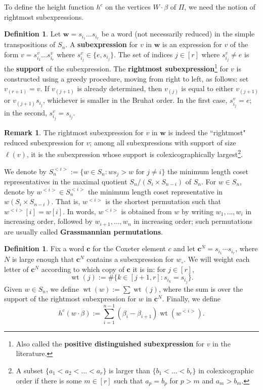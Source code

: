 \documentclass[11pt]{amsart}
\theoremstyle{definition}
\newtheorem{definition}[Thm]{Definition}
\newtheorem{remark}[Thm]{Remark}
\DeclareMathOperator{\wt}{wt}
\newcommand\defn[1]{{\bf #1}}
\def\wo{w_\circ}
\def\hgt{h}
\def\pbolic^#1{^{<#1>}}
\def\bw{\mathbf{w}}
\def\bc{\mathbf{c}}
\def\vl#1{v_{(#1)}}
\def\hc{\hgt^c}
\def\pt{\beta}
\begin{document}
To define the height function $\hc$ on the vertices $W \cdot \pt$ of $\Pi$, we need the notion of rightmost subexpressions.

\begin{definition}\label{def:rmost-sub}
	Let $\bw=s_{i_1} \dots s_{i_r}$ be a word (not necessarily reduced) in the simple transpositions of $S_n$. A \defn{subexpression} for $v$ in $\bw$ is an expression for $v$ of the form $v=s_{i_1}^v \dots s_{i_r}^v$ where $s_{i_j}^v \in \{e, s_{i_j}\}$. The set of indices $j \in [r]$ where $s_{i_j}^v \neq e$ is the \defn{support} of the subexpression. The \defn{rightmost subexpression}\footnote{Also called the \defn{positive distinguished subexpression} for $v$ in the literature.} for $v$ is constructed using a greedy procedure, moving from right to left, as follows: set  $\vl{r+1}=v$. If $\vl{j+1}$ is already determined, then $\vl{j}$ is equal to either $\vl{j+1}$ or $\vl{j+1}s_{i_{j}}$, whichever is smaller in the Bruhat order. In the first case, $s_{i_j}^v=e$; in the second, $s_{i_j}^v=s_{i_j}$. 
\end{definition}

\begin{remark}
	The rightmost subexpression for $v$ in $\bw$ is indeed the ``rightmost" reduced subexpression for $v$; among all subexpressions with support of size $\ell(v)$, it is the subexpression whose support is colexicographically largest\footnote{A subset $\{a_1< a_2 < \dots < a_r\}$ is larger than $\{b_1 < \dots < b_r\}$ in colexicographic order if there is some $m\in [r]$ such that $a_p= b_p$ for $p >m$ and $a_m>b_m$.}.
\end{remark}

We denote by $S_n\pbolic^{i}:=\{w \in S_n: ws_j>w \text{ for } j \neq i\}$
the minimum length coset representatives in
the maximal quotient $S_n / (S_i \times S_{n-i})$ of $S_n$. For $w \in S_n$, denote by
$w\pbolic^{i} \in S_n\pbolic^{i}$ the minimum length coset
representative in $w(S_i \times S_{n-i})$. That is, $w\pbolic^{i}$ is the shortest
permutation such that $w\pbolic^{i}[i]=w[i]$. In words, $w\pbolic^{i}$
is obtained from $w$ by writing $w_1, \dots, w_i$ in increasing order,
followed by $w_{i+1}, \dots, w_n$ in increasing
order; such permutations are usually called \defn{Grassmannian permutations}.


\begin{definition}\label{def:height-from-c}
	Fix a word $\bc$ for the Coxeter element $c$ and let $\bc^N=s_{i_1} \cdots s_{i_r}$, where $N$ is large enough that $\bc^N$ contains a subexpression for $\wo$. We will weight each letter of $\bc^N$ according to which copy of $\bc$ it is in: for $j \in [r]$, 
	\[\wt(j):=\#\{k\in [j+1, r]: s_{i_k}=s_{i_j}\}.\]
	Given $w \in S_n$, we define 
	$\wt(w):= \sum \wt(j)$,
	where the sum is over the support of the rightmost subexpression for $w$ in $\bc^N$. Finally, we define
	\begin{equation}\label{eq:hc-def}
	\hc(w \cdot \pt):= \sum_{i=1}^{n-1} (\pt_{i} - \pt_{i+1}) \wt(w\pbolic^i).
	\end{equation}
\end{definition}
\end{document}
